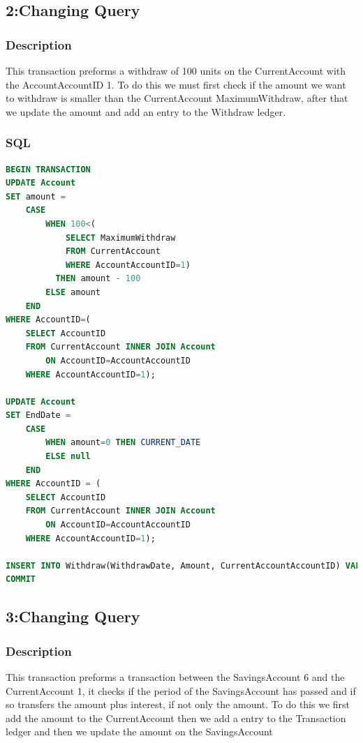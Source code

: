 \documentclass[a4paper, 10pt]{article}
\begin{document}
\subsection{2:Changing Query}
\subsubsection{Description}
This transaction preforms a withdraw of 100 units on the CurrentAccount with the AccountAccountID 1. To do this we must first check if the amount we want to withdraw is smaller than the CurrentAccount MaximumWithdraw, after that we update the amount and add an entry to the Withdraw ledger.

\subsubsection{SQL}
\begin{lstlisting}[language=SQL]
BEGIN TRANSACTION
UPDATE Account
SET amount =
    CASE 
        WHEN 100<(
            SELECT MaximumWithdraw 
            FROM CurrentAccount 
            WHERE AccountAccountID=1) 
          THEN amount - 100
        ELSE amount
    END
WHERE AccountID=(
    SELECT AccountID 
    FROM CurrentAccount INNER JOIN Account 
        ON AccountID=AccountAccountID 
    WHERE AccountAccountID=1);

UPDATE Account
SET EndDate =
    CASE 
        WHEN amount=0 THEN CURRENT_DATE
        ELSE null
    END
WHERE AccountID = (
    SELECT AccountID 
    FROM CurrentAccount INNER JOIN Account 
        ON AccountID=AccountAccountID 
    WHERE AccountAccountID=1);

INSERT INTO Withdraw(WithdrawDate, Amount, CurrentAccountAccountID) VALUES(CURRENT_DATE, 100, 1);
COMMIT
\end{lstlisting}

\subsection{3:Changing Query}
\subsubsection{Description}
This transaction preforms a transaction between the SavingsAccount 6 and the CurrentAccount 1, it checks if the period of the SavingsAccount has passed and if so transfers the amount plus interest, if not only the amount. To do this we first add the amount to the CurrentAccount then we add a entry to the Transaction ledger and then we update the amount on the SavingsAccount
\end{document}
